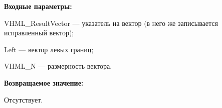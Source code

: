 \textbf{Входные параметры:}  
 
VHML\_ResultVector --- указатель на вектор (в него же записывается исправленный вектор);
 
Left --- вектор левых границ;
 
VHML\_N --- размерность вектора.

\textbf{Возвращаемое значение:}

Отсутствует.
